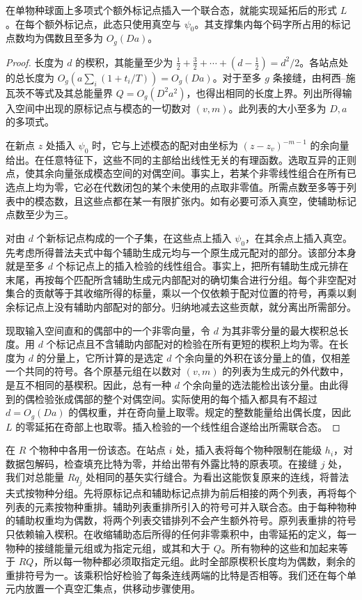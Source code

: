 \begin{lemma}[权重有界的辅助标记点]\label{lem:plant-probes} 在单物种球面上多项式个额外标记点插入一个联合态，就能实现延拓后的形式 $L$。在每个额外标记点，此态只使用真空与 $\psi_0$。其支撑集内每个码字所占用的标记点数均为偶数且至多为 $O_g(Da)$。\end{lemma}
\begin{proof} 长度为 $d$ 的楔积，其能量至少为 $\tfrac12+\tfrac32+\cdots+(d-\tfrac12)=d^2/2$。各站点处的总长度为 $O_g(a\sum_i(1+t_i/T))=O_g(Da)$。对于至多 $g$ 条接缝，由柯西–施瓦茨不等式及其总能量界 $Q=O_g(D^2a^2)$，也得出相同的长度上界。列出所得输入空间中出现的原标记点与模态的一切数对 $(v,m)$。此列表的大小至多为 $D,a$ 的多项式。

在新点 $z$ 处插入 $\psi_0$ 时，它与上述模态的配对由坐标为 $(z-z_v)^{-m-1}$ 的余向量给出。在任意特征下，这些不同的主部给出线性无关的有理函数。选取互异的正则点，使其余向量张成模态空间的对偶空间。事实上，若某个非零线性组合在所有已选点上均为零，它必在代数闭包的某个未使用的点取非零值。所需点数至多等于列表中的模态数，且这些点都在某一有限扩张内。如有必要可添入真空，使辅助标记点数至少为三。

对由 $d$ 个新标记点构成的一个子集，在这些点上插入 $\psi_0$，在其余点上插入真空。先考虑所得普法夫式中每个辅助生成元均与一个原生成元配对的部分。该部分本身就是至多 $d$ 个标记点上的插入检验的线性组合。事实上，把所有辅助生成元排在末尾，再按每个匹配所含辅助生成元内部配对的确切集合进行分组。每个非空配对集合的贡献等于其收缩所得的标量，乘以一个仅依赖于配对位置的符号，再乘以剩余标记点上没有辅助内部配对的部分。归纳地减去这些贡献，就分离出所需部分。

现取输入空间直和的偶部中的一个非零向量，令 $d$ 为其非零分量的最大楔积总长度。用 $d$ 个标记点且不含辅助内部配对的检验在所有更短的楔积上均为零。在长度为 $d$ 的分量上，它所计算的是选定 $d$ 个余向量的外积在该分量上的值，仅相差一个共同的符号。各个原基元组在以数对 $(v,m)$ 的列表为生成元的外代数中，是互不相同的基楔积。因此，总有一种 $d$ 个余向量的选法能检出该分量。由此得到的偶检验张成偶部的整个对偶空间。实际使用的每个插入都具有不超过 $d=O_g(Da)$ 的偶权重，并在奇向量上取零。规定的整数能量给出偶长度，因此 $L$ 的零延拓在奇部上也取零。插入检验的一个线性组合遂给出所需联合态。\end{proof}

在 $R$ 个物种中各用一份该态。在站点 $i$ 处，插入表将每个物种限制在能级 $h_i$，对数据包解码，检查填充比特为零，并给出带有外露比特的原表项。在接缝 $j$ 处，我们对总能量 $Rq_j$ 处相同的基矢实行缝合。为看出这能恢复原来的连线，将普法夫式按物种分组。先将原标记点和辅助标记点排为前后相接的两个列表，再将每个列表的元素按物种重排。辅助列表重排所引入的符号可并入联合态。由于每种物种的辅助权重均为偶数，将两个列表交错排列不会产生额外符号。原列表重排的符号只依赖输入楔积。在收缩辅助态后所得的任何非零乘积中，由零延拓的定义，每一物种的接缝能量元组或为指定元组，或其和大于 $Q$。所有物种的这些和加起来等于 $RQ$，所以每一物种都必须取指定元组。此时全部原楔积长度均为偶数，剩余的重排符号为一。该乘积恰好检验了每条连线两端的比特是否相等。我们还在每个单元内放置一个真空汇集点，供移动步骤使用。

